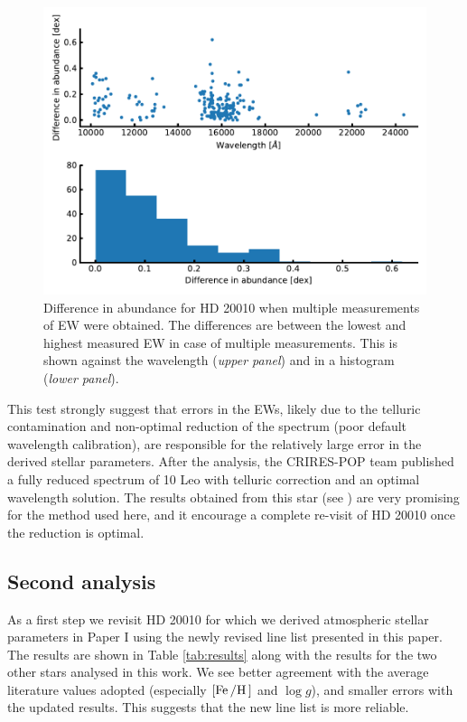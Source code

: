 \begin{figure}[htpb!]
    \centering
    \includegraphics[width=0.8\linewidth]{figures/HD20010abundance_error.pdf}
    \caption{Difference in abundance for HD 20010 when multiple measurements of EW were obtained.
             The differences are between the lowest and highest measured EW in case of multiple
             measurements. This is shown against the wavelength (\emph{upper panel}) and in a
             histogram (\emph{lower panel}).}
    \label{fig:HD20010abundance}
\end{figure}


This test strongly suggest that errors in the EWs, likely due to the telluric contamination and
non-optimal reduction of the spectrum (poor default wavelength calibration), are responsible for the
relatively large error in the derived stellar parameters. After the analysis, the CRIRES-POP team
published a fully reduced spectrum of 10 Leo \citep{Nicholls2017} with telluric correction and
an optimal wavelength solution. The results obtained from this star (see ) are very
promising for the method used here, and it encourage a complete re-visit of HD 20010 once the
reduction is optimal.


\subsection{Second analysis}
\label{sec:HD20010_second}

As a first step we revisit HD 20010 for which we derived atmospheric stellar parameters in Paper I
using the newly revised line list presented in this paper. The results are shown in Table
\ref{tab:results} along with the results for the two other stars analysed in this work. We see
better agreement with the average literature values adopted (especially $[\ion{Fe}/\ion{H}]$ and
$\log g$), and smaller errors with the updated results. This suggests that the new line list is more
reliable.

